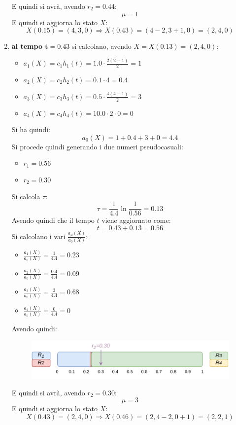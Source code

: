 \documentclass{article}
\begin{document}
\begin{enumerate}[label=\roman*)]
\begin{figure}[H]
  \end{figure}
  E quindi si avrà, avendo $r_2=0.44$:
  \[\mu=1\]
  E quindi si aggiorna lo stato $X$:
  \[X(0.15) = (4,3,0) \Rightarrow X(0.43) = (4-2,3+1,0) = (2,4,0)\]
  \newpage
  \item \textbf{al tempo $\mathbf{t=0.43}$} si calcolano, avendo
  $X=X(0.13)=(2,4,0)$: 
  \begin{multicols}{2}
    \begin{itemize}
      \item $a_1(X)=c_1h_1(t)=1.0\cdot\frac{2(2-1)}{2}=1$
      \item $a_2(X)=c_2h_2(t)=0.1\cdot 4=0.4$
      \item $a_3(X)=c_3h_3(t)=0.5\cdot \frac{4(4-1)}{2}=3$
      \item $a_4(X)=c_4h_4(t)=10.0\cdot 2 \cdot 0=0$
    \end{itemize}
  \end{multicols}
  Si ha quindi:
  \[a_0(X)=1+0.4+3+0=4.4\]
  Si procede quindi generando i due numeri pseudocasuali:
  \begin{multicols}{2}
    \begin{itemize}
      \item $r_1=0.56$
      \item $r_2=0.30$
    \end{itemize}
  \end{multicols}
  Si calcola $\tau$:
  \[\tau=\frac{1}{4.4}\ln\frac{1}{0.56}=0.13\]
  Avendo quindi che il tempo $t$ viene aggiornato come:
  \[t=0.43+0.13=0.56\]
  Si calcolano i vari $\frac{a_\mu(X)}{a_0(X)}$:
  \begin{multicols}{2}
    \begin{itemize}
      \item $\frac{a_1(X)}{a_0(X)}=\frac{1}{4.4}=0.23$
      \item $\frac{a_2(X)}{a_0(X)}=\frac{0.4}{4.4}=0.09$
      \item $\frac{a_3(X)}{a_0(X)}=\frac{3}{4.4}=0.68$
      \item $\frac{a_4(X)}{a_0(X)}=\frac{0}{4.4}=0$
    \end{itemize}
  \end{multicols}
  Avendo quindi:
  \begin{figure}[H]
    \centering
    \includegraphics[scale = 0.8]{img/t5.pdf}
  \end{figure}
  E quindi si avrà, avendo $r_2=0.30$:
  \[\mu=3\]
  E quindi si aggiorna lo stato $X$:
  \[X(0.43) = (2,4,0) \Rightarrow X(0.46) = (2,4-2,0+1) = (2,2,1)\]
\end{enumerate}
\end{document}
